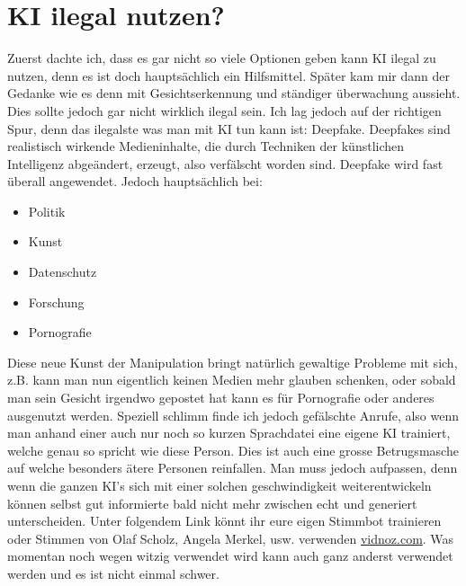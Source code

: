 \section{KI ilegal nutzen?}
Zuerst dachte ich, dass es gar nicht so viele Optionen geben kann KI ilegal zu nutzen, denn es ist doch hauptsächlich ein Hilfsmittel.
Später kam mir dann der Gedanke wie es denn mit Gesichtserkennung und ständiger überwachung aussieht. Dies sollte jedoch gar nicht wirklich ilegal sein. 
Ich lag jedoch auf der richtigen Spur, denn das ilegalste was man mit KI tun kann ist: Deepfake.
Deepfakes sind realistisch wirkende Medieninhalte, die durch Techniken der künstlichen Intelligenz abgeändert, erzeugt, also verfälscht worden sind.\citep{deepfake-wikipedia}
Deepfake wird fast überall angewendet. Jedoch hauptsächlich bei:
\begin{itemize}
    \item Politik
    \item Kunst
    \item Datenschutz
    \item Forschung
    \item Pornografie
\end{itemize}
Diese neue Kunst der Manipulation bringt natürlich gewaltige Probleme mit sich, z.B. kann man nun eigentlich keinen Medien mehr glauben schenken, oder sobald man sein Gesicht irgendwo gepostet hat kann es für Pornografie oder anderes ausgenutzt werden.
Speziell schlimm finde ich jedoch gefälschte Anrufe, also wenn man anhand einer auch nur noch so kurzen Sprachdatei eine eigene KI trainiert, welche genau so spricht wie diese Person. Dies ist auch eine grosse Betrugsmasche auf welche besonders ätere Personen reinfallen. Man muss jedoch aufpassen, denn wenn die ganzen KI's sich mit einer solchen geschwindigkeit weiterentwickeln können selbst gut informierte bald nicht mehr zwischen echt und generiert unterscheiden.
Unter folgendem Link könnt ihr eure eigen Stimmbot trainieren oder Stimmen von Olaf Scholz, Angela Merkel, usw. verwenden \href{https://de.vidnoz.com/stimme-klonen.html?insur=degooglecamp_voiceclone_stimmen%20ai%20eigene%20stimme&gad_source=1&gclid=CjwKCAjwx-CyBhAqEiwAeOcTdXzrCxZKDQlEb6uY7WpuKmMl4A4Kjq1nL8A8dgPwKI11yVB6GCWjixoCfvIQAvD_BwE}{vidnoz.com}.
Was momentan noch wegen witzig verwendet wird kann auch ganz anderst verwendet werden und es ist nicht einmal schwer.
